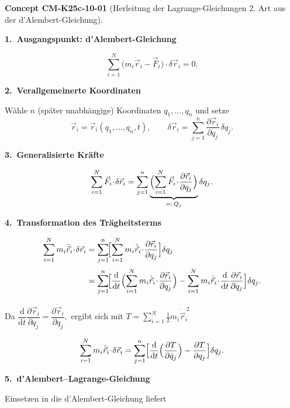 \documentclass[10pt, letterpaper]{article}
\newcommand{\CustomHeading}[3]{%
  \par\medskip\noindent%
  \textbf{#1 #2} \textnormal{(#3)}.\enskip%
}
\newenvironment{CONC}[2]{\begin{unitbox}\CustomHeading{Concept}{#1}{#2}}{\end{unitbox}}
\begin{document}
\begin{CONC}{CM-K25c-10-01}{Herleitung der Lagrange-Gleichungen 2. Art aus der d’Alembert-Gleichung}
\textbf{1.\ Ausgangspunkt: d’Alembert-Gleichung}

\[
  \sum_{i=1}^{N}\bigl(m_i\ddot{\vec r}_i-\vec F_i\bigr)\!\cdot\!\delta\vec r_i=0.
\]

\textbf{2.\ Verallgemeinerte Koordinaten}

Wähle $n$ (später unabhängige) Koordinaten $q_1,\dots,q_n$  
und setze
\[
  \vec r_i=\vec r_i(q_1,\dots,q_n,t),
  \qquad
  \delta\vec r_i=\sum_{j=1}^{n}
                  \frac{\partial\vec r_i}{\partial q_j}\,\delta q_j.
\]

\textbf{3.\ Generalisierte Kräfte}

\[
  \sum_{i=1}^{N}\vec F_i\!\cdot\!\delta\vec r_i
  =\sum_{j=1}^{n}
     \underbrace{\Bigl(
       \sum_{i=1}^{N}\vec F_i\!\cdot\!
       \frac{\partial\vec r_i}{\partial q_j}
     \Bigr)}_{=:\,Q_j}
     \delta q_j.
\]

\textbf{4.\ Transformation des Trägheitsterms}

\[
\begin{aligned}
  \sum_{i=1}^{N}m_i\ddot{\vec r}_i\!\cdot\!\delta\vec r_i
  &=\sum_{j=1}^{n}\!
     \Bigl[
       \sum_{i=1}^{N}
         m_i\ddot{\vec r}_i\!\cdot\!
         \frac{\partial\vec r_i}{\partial q_j}
     \Bigr]\delta q_j\\[2pt]
  &=\sum_{j=1}^{n}\!
     \Bigl[
       \frac{\mathrm d}{\mathrm dt}
         \Bigl(
           \sum_{i=1}^{N}
             m_i\dot{\vec r}_i\!\cdot\!
             \frac{\partial\vec r_i}{\partial q_j}
         \Bigr)
       -
       \sum_{i=1}^{N}
         m_i\dot{\vec r}_i\!\cdot\!
         \frac{\mathrm d}{\mathrm dt}
           \frac{\partial\vec r_i}{\partial q_j}
     \Bigr]\delta q_j .
\end{aligned}
\]

Da
\(
  \dfrac{\mathrm d}{\mathrm dt}
  \dfrac{\partial\vec r_i}{\partial q_j}
  =
  \dfrac{\partial\dot{\vec r}_i}{\partial q_j},
\)
ergibt sich mit
\(
  T=\sum_{i=1}^{N}\tfrac12m_i\dot{\vec r}_i^{\,2}
\)

\[
  \sum_{i=1}^{N}m_i\ddot{\vec r}_i\!\cdot\!\delta\vec r_i
  =
  \sum_{j=1}^{n}
    \Bigl[
      \frac{\mathrm d}{\mathrm dt}
        \Bigl(\frac{\partial T}{\partial\dot q_j}\Bigr)
      -
      \frac{\partial T}{\partial q_j}
    \Bigr]\delta q_j .
\]

\textbf{5.\ d’Alembert–Lagrange-Gleichung}

Einsetzen in die d’Alembert-Gleichung liefert


\end{CONC}
\end{document}

